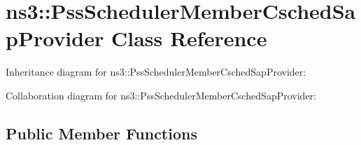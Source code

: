 \hypertarget{classns3_1_1PssSchedulerMemberCschedSapProvider}{}\section{ns3\+:\+:Pss\+Scheduler\+Member\+Csched\+Sap\+Provider Class Reference}
\label{classns3_1_1PssSchedulerMemberCschedSapProvider}


Inheritance diagram for ns3\+:\+:Pss\+Scheduler\+Member\+Csched\+Sap\+Provider\+:


Collaboration diagram for ns3\+:\+:Pss\+Scheduler\+Member\+Csched\+Sap\+Provider\+:
\subsection*{Public Member Functions}
